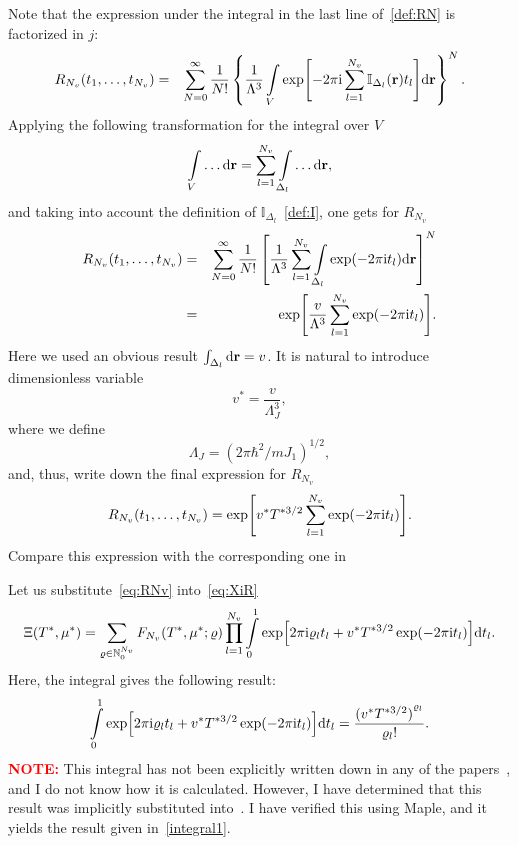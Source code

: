 \documentclass[12pt]{article}
\numberwithin{equation}{section}
\begin{document}
	Note that the expression under the integral in the last line of~\eqref{def:RN} is factorized in $j$:
	\begin{eqnarray}
		R_{N_v}(t_1, \ldots, t_{N_v}) & = & \sum_{N=0}^{\infty}\frac{1}{N!} 
		\left\{\frac{1}{\Lambda^{3}} \int\limits_V \exp[-2\pi{\rm i}\sum_{l=1}^{N_v} \mathbb{I}_{\Delta_{l}}(\vb{r}) t_l] {\rm d} \vb{r} \right\}^N.
	\end{eqnarray}
	Applying the following transformation for the integral over $V$
	\begin{equation}
		\int\limits_V \ldots {\rm d} \vb{r} = \sum_{l=1}^{N_v}\int\limits_{\Delta_l} \ldots {\rm d} \vb{r},
	\end{equation}
	and taking into account the definition of $\mathbb{I}_{\Delta_l}$~\eqref{def:I}, one gets for $R_{N_v}$
	\begin{eqnarray}
		\label{eq:RNL}
		R_{N_v}(t_1, \ldots, t_{N_v}) & = & \sum_{N=0}^{\infty}\frac{1}{N!} \left[ \frac{1}{\Lambda^3} \sum_{l=1}^{N_v} \int\limits_{\Delta_l} \exp(-2\pi{\rm i}t_l) {\rm d} \vb{r} \right]^N
		\nonumber\\
		&=& \exp[\frac{v}{\Lambda^3} \sum_{l=1}^{N_v} \exp(-2\pi{\rm i} t_l)].
	\end{eqnarray}
	Here we used an obvious result $\int_{\Delta_l} {\rm d} \vb{r} = v$. It is natural to introduce dimensionless variable
	\begin{equation}
		\label{def:v_star}
		v^* = \frac{v}{\Lambda^3_J},
	\end{equation}
	where we define
	\begin{equation}
		\Lambda_J = (2\pi\hbar^2/mJ_1)^{1/2},
	\end{equation}
	and, thus, write down the final expression for $R_{N_v}$
	\begin{equation}
		\label{eq:RNv}
		R_{N_v}(t_1, \ldots, t_{N_v}) = \exp[v^* T^{*3/2} \sum_{l=1}^{N_v} \exp(-2\pi{\rm i} t_l)].
	\end{equation}
	Compare this expression with the corresponding one in~\cite[p.~4]{KKD20} 
	
	Let us substitute~\eqref{eq:RNv} into~\eqref{eq:XiR}
	\begin{equation}
		\label{eq:XiIntt}
		\Xi(T^*,\mu^*) = \sum_{\varrho \in \mathbb{N}_0^{N_v}} F_{N_v}(T^*, \mu^*; \varrho) \prod\limits_{l=1}^{N_v} \int\limits_{0}^{1} \exp[2\pi{\rm i}\varrho_l t_l + v^* T^{*3/2} \exp(-2\pi{\rm i} t_l)] {\rm d} t_l.
	\end{equation}
	Here, the integral gives the following result:
	\begin{equation}
		\label{integral1}
		\int\limits_{0}^{1} \exp[2\pi{\rm i}\varrho_l t_l + v^* T^{*3/2} \exp(-2\pi{\rm i} t_l)] {\rm d} t_l = \frac{{(v^* T^{*3/2})}^{\varrho_l}}{\varrho_l !}.
	\end{equation}
	\textbf{\textcolor{Red}{NOTE:}} This integral has not been explicitly written down in any of the papers~\cite{KKD18, KKD20, KD22}, and I do not know how it is calculated. However, I have determined that this result was implicitly substituted into~\cite[(2.11)]{KKD20}. I have verified this using Maple, and it yields the result given in~\eqref{integral1}.
	
\end{document}
